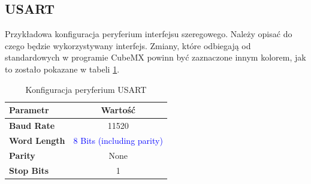 \documentclass[10pt, a4paper]{article}
\begin{document}
\subsection{USART}

Przykładowa konfiguracja peryferium interfejsu szeregowego.
Należy opisać do czego będzie wykorzystywany interfejs. 
Zmiany, które odbiegają od standardowych w programie CubeMX 
powinn być zaznaczone innym kolorem, jak to zostało pokazane 
w tabeli \ref{tab:USART}.

\begin{table}[H]
	\centering
	\begin{tabular}{|l|c|} \hline
		\textbf{Parametr} & Wartość \\
		\hline
		\hline  \textbf{Baud Rate}&11520  \\\hline
		\textbf{Word Length } & \textcolor{blue}{8 Bits (including parity)}\\\hline
		\textbf{Parity} &  None\\
		\hline
		\textbf{Stop Bits}& 1\\
		\hline
	\end{tabular}
	\caption{Konfiguracja peryferium USART}
	\label{tab:USART}
\end{table}






\end{document}
